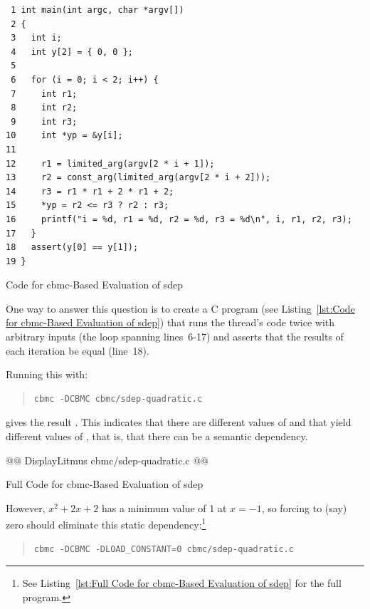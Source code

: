 \documentclass[10]{article}
\begin{document}
\begin{listing}[tbp]
\scriptsize
\begin{verbatim}
 1 int main(int argc, char *argv[])
 2 {
 3   int i;
 4   int y[2] = { 0, 0 };
 5
 6   for (i = 0; i < 2; i++) {
 7     int r1;
 8     int r2;
 9     int r3;
10     int *yp = &y[i];
11
12     r1 = limited_arg(argv[2 * i + 1]);
13     r2 = const_arg(limited_arg(argv[2 * i + 2]));
14     r3 = r1 * r1 + 2 * r1 + 2;
15     *yp = r2 <= r3 ? r2 : r3;
16     printf("i = %d, r1 = %d, r2 = %d, r3 = %d\n", i, r1, r2, r3);
17   }
18   assert(y[0] == y[1]);
19 }
\end{verbatim}
\caption{Code for cbmc-Based Evaluation of sdep}
\label{lst:Code for cbmc-Based Evaluation of sdep}
\end{listing}

One way to answer this question is to create a C program
(see Listing~\ref{lst:Code for cbmc-Based Evaluation of sdep})
that runs the  thread's code twice with arbitrary inputs
(the loop spanning lines~6-17) and asserts that the results of
each iteration be equal (line~18).

Running this with:

\begin{quote}
\scriptsize
\begin{verbatim}
cbmc -DCBMC cbmc/sdep-quadratic.c
\end{verbatim}
\end{quote}

gives the result .
This indicates that there are different values of  and 
that yield different values of , that is, that there can be
a semantic dependency.

\begin{listing}[tbp]
@@ DisplayLitmus cbmc/sdep-quadratic.c @@
\caption{Full Code for cbmc-Based Evaluation of sdep}
\label{lst:Full Code for cbmc-Based Evaluation of sdep}
\end{listing}

However, $x^2 + 2x + 2$ has a minimum value of 1 at $x=-1$, so
forcing  to (say) zero should eliminate this static
dependency:\footnote{
	See Listing~\ref{lst:Full Code for cbmc-Based Evaluation of sdep}
	for the full  program.}

\begin{quote}
\scriptsize
\begin{verbatim}
cbmc -DCBMC -DLOAD_CONSTANT=0 cbmc/sdep-quadratic.c
\end{verbatim}
\end{quote}
\end{document}
